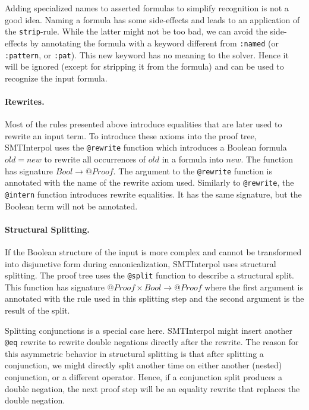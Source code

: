 \documentclass[a4paper]{article}
\newcommand\si{SMTInterpol\xspace}
\begin{document}
Adding specialized names to asserted formulas to simplify recognition is not a
good idea.  Naming a formula has some side-effects and leads to an application
of the \verb+strip+-rule.  While the latter might not be too bad, we can avoid
the side-effects by annotating the formula with a keyword different from
\verb+:named+ (or \verb+:pattern+, or \verb+:pat+).  This new keyword has no
meaning to the solver.  Hence it will be ignored (except for stripping it from
the formula) and can be used to recognize the input formula.

\paragraph{Rewrites.}  Most of the rules presented above introduce equalities
that are later used to rewrite an input term.  To introduce these axioms into
the proof tree, \si uses the \verb+@rewrite+ function which introduces a
Boolean formula $old = new$ to rewrite all occurrences of $old$ in a formula
into $new$.  The function has signature $Bool\rightarrow @Proof$.  The
argument to the \verb+@rewrite+ function is annotated with the name of the
rewrite axiom used.  Similarly to \verb+@rewrite+, the \verb+@intern+ function
introduces rewrite equalities.  It has the same signature, but the Boolean
term will not be annotated.

\paragraph{Structural Splitting.}  If the Boolean structure of the input is
more complex and cannot be transformed into disjunctive form during
canonicalization, \si uses structural splitting.  The proof tree uses the
\verb+@split+ function to describe a structural split.  This function has
signature $@Proof\times Bool\rightarrow @Proof$ where the first argument is
annotated with the rule used in this splitting step and the second argument is
the result of the split.

Splitting conjunctions is a special case here.  \si might insert another
\verb+@eq+ rewrite to rewrite double negations directly after the rewrite.
The reason for this asymmetric behavior in structural splitting is that after
splitting a conjunction, we might directly split another time on either
another (nested) conjunction, or a different operator.  Hence, if a
conjunction split produces a double negation, the next proof step will be an
equality rewrite that replaces the double negation.
\end{document}
